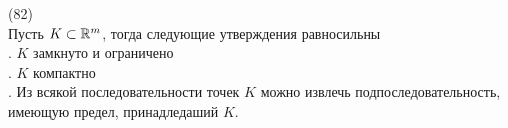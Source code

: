(82)\\
Пусть $K \subset \mathbb{R}^m$, тогда следующие утверждения равносильны\\
. $K$ замкнуто и ограничено\\
. $K$ компактно\\
. Из всякой последовательности точек $K$ можно извлечь подпоследовательность, имеющую предел, принадледаший $K$.